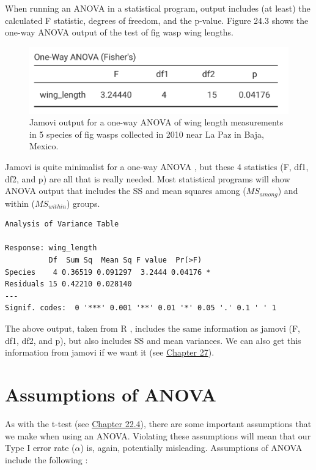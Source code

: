 \documentclass[
  openany]{krantz}
\begin{document}
When running an ANOVA in a statistical program, output includes (at least) the calculated F statistic, degrees of freedom, and the p-value.
Figure 24.3 shows the one-way ANOVA output of the test of fig wasp wing lengths.

\begin{figure}
\includegraphics[width=0.6\linewidth]{img/jamovi_ANOVA_output} \caption{Jamovi output for a one-way ANOVA of wing length measurements in 5 species of fig wasps collected in 2010 near La Paz in Baja, Mexico.}\label{fig:unnamed-chunk-100}
\end{figure}

Jamovi is quite minimalist for a one-way ANOVA \citep{Jamovi2022}, but these 4 statistics (F, df1, df2, and p) are all that is really needed.
Most statistical programs will show ANOVA output that includes the SS and mean squares among (\(MS_{among}\)) and within (\(MS_{within}\)) groups.

\begin{verbatim}
Analysis of Variance Table

Response: wing_length
          Df  Sum Sq  Mean Sq F value  Pr(>F)  
Species    4 0.36519 0.091297  3.2444 0.04176 *
Residuals 15 0.42210 0.028140                  
---
Signif. codes:  0 '***' 0.001 '**' 0.01 '*' 0.05 '.' 0.1 ' ' 1
\end{verbatim}

The above output, taken from R \citep{Rproject}, includes the same information as jamovi (F, df1, df2, and p), but also includes SS and mean variances.
We can also get this information from jamovi if we want it (see \protect\hyperlink{Chapter_27}{Chapter 27}).

\hypertarget{assumptions-of-anova}{%
\section{Assumptions of ANOVA}\label{assumptions-of-anova}}

As with the t-test (see \protect\hyperlink{assumptions-of-t-tests}{Chapter 22.4}), there are some important assumptions that we make when using an ANOVA.
Violating these assumptions will mean that our Type I error rate (\(\alpha\)) is, again, potentially misleading.
Assumptions of ANOVA include the following \citep{Box1978, Sokal1995}:
\end{document}
